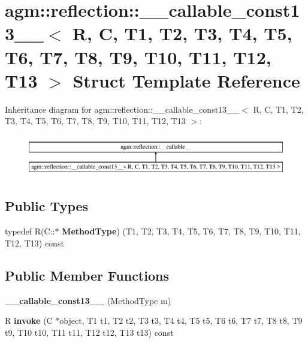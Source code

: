 \hypertarget{structagm_1_1reflection_1_1____callable__const13____}{}\section{agm\+:\+:reflection\+:\+:\+\_\+\+\_\+callable\+\_\+const13\+\_\+\+\_\+$<$ R, C, T1, T2, T3, T4, T5, T6, T7, T8, T9, T10, T11, T12, T13 $>$ Struct Template Reference}
\label{structagm_1_1reflection_1_1____callable__const13____}
Inheritance diagram for agm\+:\+:reflection\+:\+:\+\_\+\+\_\+callable\+\_\+const13\+\_\+\+\_\+$<$ R, C, T1, T2, T3, T4, T5, T6, T7, T8, T9, T10, T11, T12, T13 $>$\+:\begin{figure}[H]
\begin{center}
\leavevmode
\includegraphics[height=1.842105cm]{structagm_1_1reflection_1_1____callable__const13____}
\end{center}
\end{figure}
\subsection*{Public Types}
\begin{DoxyCompactItemize}
\item 
typedef R(C\+::$\ast$ {\bfseries Method\+Type}) (T1, T2, T3, T4, T5, T6, T7, T8, T9, T10, T11, T12, T13) const \hypertarget{structagm_1_1reflection_1_1____callable__const13_____a3a93194603902c8d8cd5af6ad58c58dc}{}\label{structagm_1_1reflection_1_1____callable__const13_____a3a93194603902c8d8cd5af6ad58c58dc}

\end{DoxyCompactItemize}
\subsection*{Public Member Functions}
\begin{DoxyCompactItemize}
\item 
{\bfseries \+\_\+\+\_\+callable\+\_\+const13\+\_\+\+\_\+} (Method\+Type m)\hypertarget{structagm_1_1reflection_1_1____callable__const13_____a357951e435c85cf1af2f0b0acfd5972f}{}\label{structagm_1_1reflection_1_1____callable__const13_____a357951e435c85cf1af2f0b0acfd5972f}

\item 
R {\bfseries invoke} (C $\ast$object, T1 t1, T2 t2, T3 t3, T4 t4, T5 t5, T6 t6, T7 t7, T8 t8, T9 t9, T10 t10, T11 t11, T12 t12, T13 t13) const \hypertarget{structagm_1_1reflection_1_1____callable__const13_____afab0bd6580b0bfe85da9f4844bc113d6}{}\label{structagm_1_1reflection_1_1____callable__const13_____afab0bd6580b0bfe85da9f4844bc113d6}

\end{DoxyCompactItemize}
